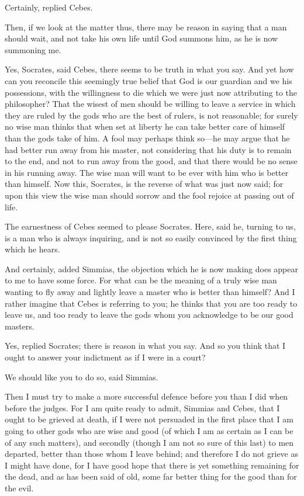 \documentclass[11pt,letter]{article}
\begin{document}
\par  Certainly, replied Cebes.

\par  Then, if we look at the matter thus, there may be reason in saying that a man should wait, and not take his own life until God summons him, as he is now summoning me.

\par  Yes, Socrates, said Cebes, there seems to be truth in what you say. And yet how can you reconcile this seemingly true belief that God is our guardian and we his possessions, with the willingness to die which we were just now attributing to the philosopher? That the wisest of men should be willing to leave a service in which they are ruled by the gods who are the best of rulers, is not reasonable; for surely no wise man thinks that when set at liberty he can take better care of himself than the gods take of him. A fool may perhaps think so—he may argue that he had better run away from his master, not considering that his duty is to remain to the end, and not to run away from the good, and that there would be no sense in his running away. The wise man will want to be ever with him who is better than himself. Now this, Socrates, is the reverse of what was just now said; for upon this view the wise man should sorrow and the fool rejoice at passing out of life.

\par  The earnestness of Cebes seemed to please Socrates. Here, said he, turning to us, is a man who is always inquiring, and is not so easily convinced by the first thing which he hears.

\par  And certainly, added Simmias, the objection which he is now making does appear to me to have some force. For what can be the meaning of a truly wise man wanting to fly away and lightly leave a master who is better than himself? And I rather imagine that Cebes is referring to you; he thinks that you are too ready to leave us, and too ready to leave the gods whom you acknowledge to be our good masters.

\par  Yes, replied Socrates; there is reason in what you say. And so you think that I ought to answer your indictment as if I were in a court?

\par  We should like you to do so, said Simmias.

\par  Then I must try to make a more successful defence before you than I did when before the judges. For I am quite ready to admit, Simmias and Cebes, that I ought to be grieved at death, if I were not persuaded in the first place that I am going to other gods who are wise and good (of which I am as certain as I can be of any such matters), and secondly (though I am not so sure of this last) to men departed, better than those whom I leave behind; and therefore I do not grieve as I might have done, for I have good hope that there is yet something remaining for the dead, and as has been said of old, some far better thing for the good than for the evil.
\end{document}
